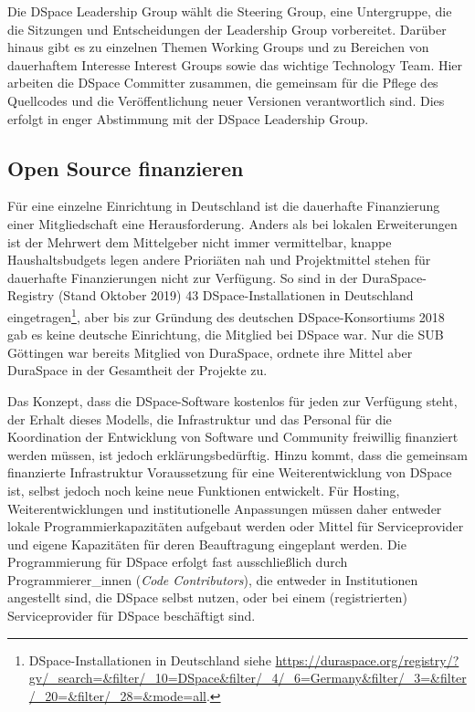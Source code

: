 \documentclass[a4paper,
fontsize=11pt,
oneside,
numbers=noperiodatend,
parskip=half-,
bibliography=totoc,
final
]{scrartcl}
\begin{document}
Die DSpace Leadership Group wählt die Steering Group, eine Untergruppe,
die die Sitzungen und Entscheidungen der Leadership Group vorbereitet.
Darüber hinaus gibt es zu einzelnen Themen Working Groups und zu
Bereichen von dauerhaftem Interesse Interest Groups sowie das wichtige
Technology Team. Hier arbeiten die DSpace Committer zusammen, die
gemeinsam für die Pflege des Quellcodes und die Veröffentlichung neuer
Versionen verantwortlich sind. Dies erfolgt in enger Abstimmung mit der
DSpace Leadership Group.

\hypertarget{open-source-finanzieren}{%
\subsection{Open Source finanzieren}\label{open-source-finanzieren}}

Für eine einzelne Einrichtung in Deutschland ist die dauerhafte
Finanzierung einer Mitgliedschaft eine Herausforderung. Anders als bei
lokalen Erweiterungen ist der Mehrwert dem Mittelgeber nicht immer
vermittelbar, knappe Haushaltsbudgets legen andere Prioriäten nah und
Projektmittel stehen für dauerhafte Finanzierungen nicht zur Verfügung.
So sind in der Dura\-Space-Registry (Stand Oktober 2019) 43
DSpace-Installationen in Deutschland eingetragen\footnote{DSpace-Installationen
  in Deutschland siehe
  \url{https://duraspace.org/registry/?gv/_search=\&filter/_10=DSpace\&filter/_4/_6=Germany\&filter/_3=\&filter/_20=\&filter/_28=\&mode=all}.},
aber bis zur Gründung des deutschen DSpace-Konsortiums 2018 gab es keine
deutsche Einrichtung, die Mitglied bei DSpace war. Nur die SUB Göttingen
war bereits Mitglied von DuraSpace, ordnete ihre Mittel aber DuraSpace
in der Gesamtheit der Projekte zu.

Das Konzept, dass die DSpace-Software kostenlos für jeden zur Verfügung
steht, der Erhalt dieses Modells, die Infrastruktur und das Personal für
die Koordination der Entwicklung von Software und Community freiwillig
finanziert werden müssen, ist jedoch erklärungsbedürftig. Hinzu kommt,
dass die gemeinsam finanzierte Infrastruktur Voraussetzung für eine
Weiterentwicklung von DSpace ist, selbst jedoch noch keine neue
Funktionen entwickelt. Für Hosting, Weiterentwicklungen und
institutionelle Anpassungen müssen daher entweder lokale
Programmierkapazitäten aufgebaut werden oder Mittel für Serviceprovider
und eigene Kapazitäten für deren Beauftragung eingeplant werden. Die
Programmierung für DSpace erfolgt fast ausschließlich durch
Programmierer\_innen (\emph{Code Contributors}), die entweder in
Institutionen angestellt sind, die DSpace selbst nutzen, oder bei einem
(registrierten) Serviceprovider für DSpace beschäftigt sind.
\end{document}
